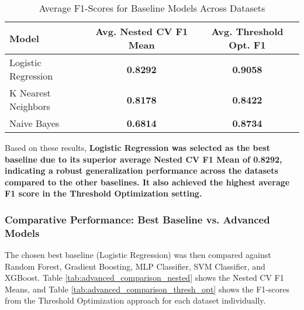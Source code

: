 \documentclass{article}
\begin{document}
\begin{table}[htbp]
\centering
\caption{Average F1-Scores for Baseline Models Across Datasets}
\label{tab:baseline_perf}
\begin{tabular}{lcc}
\toprule
Model                 & Avg. Nested CV F1 Mean & Avg. Threshold Opt. F1 \\
\midrule
Logistic Regression   & \textbf{0.8292} & \textbf{0.9058}    \\
K Nearest Neighbors   & \textbf{0.8178} & \textbf{0.8422}    \\
Naive Bayes           & \textbf{0.6814} & \textbf{0.8734}    \\
\bottomrule
\end{tabular}
\end{table}

Based on these results, \textbf{Logistic Regression was selected as the best baseline due to its superior average Nested CV F1 Mean of 0.8292, indicating a robust generalization performance across the datasets compared to the other baselines. It also achieved the highest average F1 score in the Threshold Optimization setting.}

\subsubsection{Comparative Performance: Best Baseline vs. Advanced Models}
The chosen best baseline (Logistic Regression) was then compared against Random Forest, Gradient Boosting, MLP Classifier, SVM Classifier, and XGBoost. Table \ref{tab:advanced_comparison_nested} shows the Nested CV F1 Means, and Table \ref{tab:advanced_comparison_thresh_opt} shows the F1-scores from the Threshold Optimization approach for each dataset individually.
\end{document}
